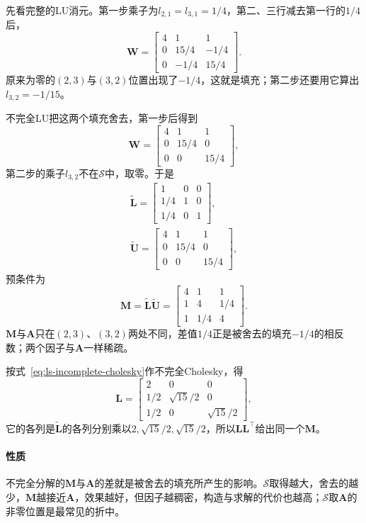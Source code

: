 先看完整的LU消元。第一步乘子为$l_{2,1}=l_{3,1}=1/4$，第二、三行减去第一行的$1/4$后，
\[
 \bm W=\begin{bmatrix}4&1&1\\0&15/4&-1/4\\0&-1/4&15/4\end{bmatrix}.
\]
原来为零的$(2,3)$与$(3,2)$位置出现了$-1/4$，这就是填充；第二步还要用它算出$l_{3,2}=-1/15$。

不完全LU把这两个填充舍去，第一步后得到
\[
 \bm W=\begin{bmatrix}4&1&1\\0&15/4&0\\0&0&15/4\end{bmatrix},
\]
第二步的乘子$l_{3,2}$不在$\mathcal S$中，取零。于是
\[
 \begin{gathered}
 \widetilde{\bm L}=\begin{bmatrix}1&0&0\\1/4&1&0\\1/4&0&1\end{bmatrix},\\
 \widetilde{\bm U}=\begin{bmatrix}4&1&1\\0&15/4&0\\0&0&15/4\end{bmatrix},
 \end{gathered}
\]
预条件为
\[
 \bm M=\widetilde{\bm L}\widetilde{\bm U}=\begin{bmatrix}4&1&1\\1&4&1/4\\1&1/4&4\end{bmatrix}.
\]
$\bm M$与$\bm A$只在$(2,3)$、$(3,2)$两处不同，差值$1/4$正是被舍去的填充$-1/4$的相反数；两个因子与$\bm A$一样稀疏。

按式~\eqref{eq:ls-incomplete-cholesky}作不完全Cholesky，得
\[
 \bm L=\begin{bmatrix}2&0&0\\1/2&\sqrt{15}/2&0\\1/2&0&\sqrt{15}/2\end{bmatrix},
\]
它的各列是$\widetilde{\bm L}$的各列分别乘以$2,\sqrt{15}/2,\sqrt{15}/2$，所以$\bm L\bm L^\top$给出同一个$\bm M$。

\paragraph{性质}
不完全分解的$\bm M$与$\bm A$的差就是被舍去的填充所产生的影响。$\mathcal S$取得越大，舍去的越少，$\bm M$越接近$\bm A$，效果越好，但因子越稠密，构造与求解的代价也越高；$\mathcal S$取$\bm A$的非零位置是最常见的折中。

